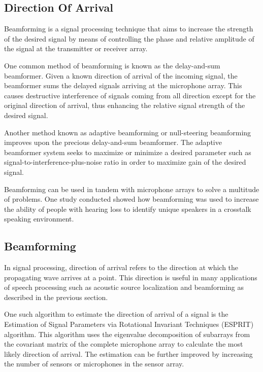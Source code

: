 \documentclass[hidelinks,12pt]{report} %
\begin{document}
\subsection{Direction Of Arrival}

Beamforming is a signal processing technique that aims to increase the strength of the desired signal by means of controlling the phase and relative amplitude of the signal at the transmitter or receiver array\cite{5}. 

One common method of beamforming is known as the delay-and-sum beamformer. Given a known direction of arrival of the incoming signal, the beamformer sums the delayed signals arriving at the microphone array. This causes destructive interference of signals coming from all direction except for the original direction of arrival, thus enhancing the relative signal strength of the desired signal\cite{6}. 

Another method known as adaptive beamforming or null-steering beamforming improves upon the precious delay-and-sum beamformer. The adaptive beamformer system seeks to maximize or minimize a desired parameter such as signal-to-interference-plus-noise ratio in order to maximize gain of the desired signal\cite{7}.

Beamforming can be used in tandem with microphone arrays to solve a multitude of problems. One study conducted showed how beamforming was used to increase the ability of people with hearing loss to identify unique speakers in a crosstalk speaking environment\cite{8}.


\subsection{Beamforming}

In signal processing, direction of arrival refers to the direction at which the propagating wave arrives at a point. This direction is useful in many applications of speech processing such as acoustic source localization\cite{9} and beamforming as described in the previous section. 

One such algorithm to estimate the direction of arrival of a signal is the Estimation of Signal Parameters via Rotational Invariant Techniques (ESPRIT) algorithm. This algorithm uses the eigenvalue decomposition of subarrays from the covariant matrix of the complete microphone array to calculate the most likely direction of arrival. The estimation can be further improved by increasing the number of sensors or microphones in the sensor array\cite{10}.
\end{document}
